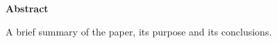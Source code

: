 
\begin{center}\textbf{Abstract}\end{center}

A brief summary of the paper, its purpose and its conclusions.
%
\lipsum[1]

\cleardoublepage



